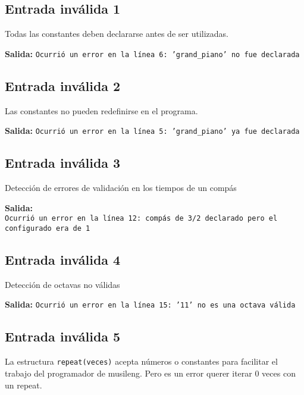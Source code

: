 \documentclass[a4paper,8pt]{article}
\begin{document}
\subsection{Entrada inválida 1}
Todas las constantes deben declararse antes de ser utilizadas.
\begin{small}
  
\end{small}

\textbf{Salida:} \texttt{Ocurrió un error en la línea 6: 'grand\_piano' no fue declarada}


\subsection{Entrada inválida 2}
Las constantes no pueden redefinirse en el programa.
\begin{small}
  
\end{small}

\textbf{Salida:} \texttt{Ocurrió un error en la línea 5: 'grand\_piano' ya fue declarada}

\subsection{Entrada inválida 3}
Detección de errores de validación en los tiempos de un compás
\begin{small}
  
\end{small}

\textbf{Salida:}\\ \texttt{Ocurrió un error en la línea 12: compás de 3/2 declarado pero el configurado era de 1}
\subsection{Entrada inválida 4}
Detección de octavas no válidas
\begin{small}
  
\end{small}

\textbf{Salida:} \texttt{Ocurrió un error en la línea 15: '11' no es una octava válida}

\subsection{Entrada inválida 5}
La estructura \texttt{repeat(veces)} acepta números o constantes para facilitar el trabajo del programador de musileng. Pero es un error querer iterar 0 veces con un repeat.
\begin{small}
  
\end{small}
\end{document}
